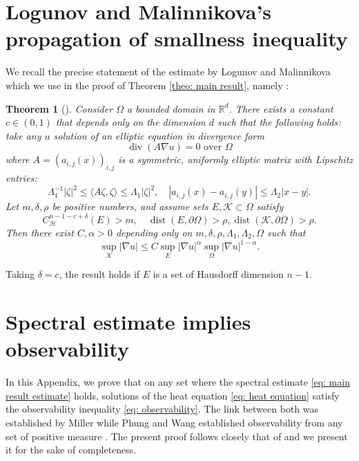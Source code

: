 \documentclass[letterpaper,11pt]{amsart}
\theoremstyle{note}
\newtheorem{theorem}{Theorem}
\numberwithin{equation}{section}
\DeclareMathOperator{\dist}{dist}
\DeclareMathOperator{\Div}{div}
\begin{document}
\appendix

\section{Logunov and Malinnikova's propagation of smallness inequality}
\label{sec: Appendix Logunov}

We recall the precise statement of the estimate by Logunov and Malinnikova which we use in the proof of Theorem \ref{theo: main result}, namely \cite[Theorem 5.1]{logunovmalinnikova2018qtttve_propag_smallness}: 

\begin{theorem}[\cite{logunovmalinnikova2018qtttve_propag_smallness}]
\label{theo: logunov-malinnikova}
    Consider $\Omega$ a bounded domain in $\mathbb{R}^d$. There exists a constant $c \in (0,1)$ that depends only on the dimension $d$ such that the following holds:
    take any $u$ solution of an elliptic equation in divergence form \begin{equation}
        \Div(A\nabla u) = 0 \text{ over } \Omega
    \end{equation} where $A = (a_{i,j}(x))_{i,j}$ is a symmetric, uniformly elliptic matrix with Lipschitz entries: $$\Lambda_1^{-1} |\zeta|^2 \leq \langle A \zeta, \zeta \rangle \leq \Lambda_1 |\zeta|^2, \quad |a_{i,j}(x) - a_{i,j}(y) | \leq \Lambda_2 |x-y|.$$ Let $m, \delta, \rho$ be positive numbers, and assume sets $E, \mathcal{K} \subset \Omega$ satisfy $$C_\mathcal{H}^{n-1-c+\delta}(E) > m, \quad \dist(E, \partial\Omega) > \rho, \dist(\mathcal{K}, \partial\Omega) > \rho.$$ Then there exist $C, \alpha > 0$ depending only on $m, \delta, \rho, \Lambda_1, \Lambda_2, \Omega$ such that $$\sup_{\mathcal{K}} |\nabla u| \leq C \sup_{E}|\nabla u|^\alpha \sup_{\Omega}|\nabla u|^{1-\alpha}.$$ 
\end{theorem} Taking $\delta = c$, the result holds if $E$ is a set of Hausdorff dimension $n-1$.

\section{Spectral estimate implies observability}
\label{sec: Appendix observability}

In this Appendix, we prove that on any set where the spectral estimate \eqref{eq: main result estimate} holds, solutions of the heat equation \eqref{eq: heat equation} satisfy the observability inequality \eqref{eq: observability}. The link between both was established by Miller \cite{miller2010directlebeaurobbiano} while Phung and Wang established observability from any set of positive measure \cite{phungwang2013observability}. The present proof follows closely that of \cite[Lemmas 2.3, 2.4]{wangwangzhangzhang2019spectralineq_heat} and we present it for the sake of completeness.
\end{document}
